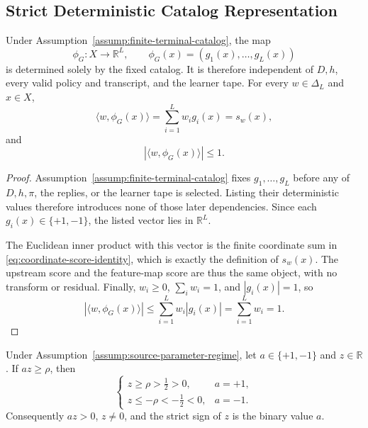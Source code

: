 \subsection{Strict Deterministic Catalog Representation}
\label{app:strict-catalog-representation}

\begin{lemma}
\label{lem:step-005-coordinate-identity}
Under Assumption~\ref{assump:finite-terminal-catalog}, the map
\[
\phi_G:X\longrightarrow\mathbb R^L,
\qquad \phi_G(x)=(g_1(x),\ldots,g_L(x))
\]
is determined solely by the fixed catalog.  It is therefore independent of
$D,h$, every valid policy and transcript, and the learner tape.  For every
$w\in\Delta_L$ and $x\in X$,
\begin{equation}\label{eq:coordinate-score-identity}
\langle w,\phi_G(x)\rangle
=\sum_{i=1}^Lw_i g_i(x)=s_w(x),
\end{equation}
and
\begin{equation}\label{eq:mixture-score-bound}
|\langle w,\phi_G(x)\rangle|\le1.
\end{equation}
\end{lemma}

\begin{proof}
Assumption~\ref{assump:finite-terminal-catalog} fixes
$g_1,\ldots,g_L$ before any of $D,h,\pi$, the replies, or the learner tape
is selected.  Listing their deterministic values therefore introduces none
of those later dependencies.  Since each $g_i(x)\in\{+1,-1\}$, the listed
vector lies in $\mathbb R^L$.

The Euclidean inner product with this vector is the finite coordinate sum in
\eqref{eq:coordinate-score-identity}, which is exactly the definition of
$s_w(x)$.  The upstream score and the feature-map score are thus the same
object, with no transform or residual.  Finally, $w_i\ge0$,
$\sum_iw_i=1$, and $|g_i(x)|=1$, so
\[
|\langle w,\phi_G(x)\rangle|
\le\sum_{i=1}^Lw_i|g_i(x)|
=\sum_{i=1}^Lw_i=1.
\]
\end{proof}

\begin{lemma}
\label{lem:step-005-binary-sign}
Under Assumption~\ref{assump:source-parameter-regime}, let
$a\in\{+1,-1\}$ and $z\in\mathbb R$.  If $az\ge\rho$, then
\[
\begin{cases}
z\ge\rho>\frac12>0,&a=+1,\\[1mm]
z\le-\rho<-\frac12<0,&a=-1.
\end{cases}
\]
Consequently $az>0$, $z\ne0$, and the strict sign of $z$ is the binary
value $a$.
\end{lemma}

